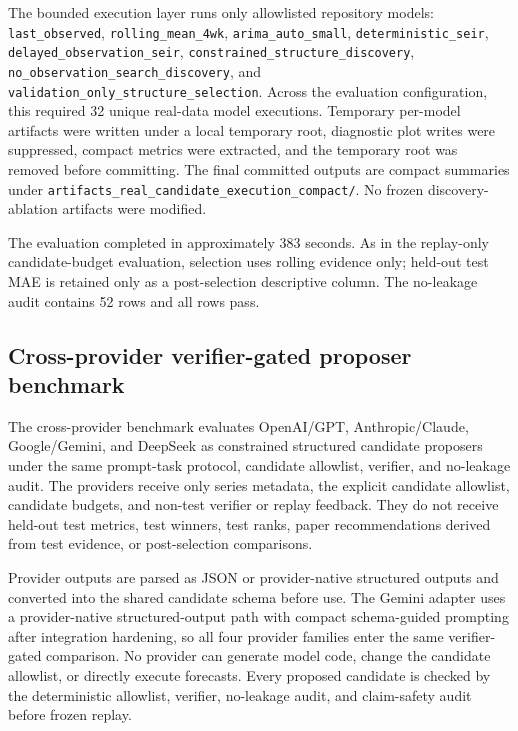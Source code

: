 The bounded execution layer runs only allowlisted repository models:
\texttt{last\_observed}, \texttt{rolling\_mean\_4wk},
\texttt{arima\_auto\_small}, \texttt{deterministic\_seir},
\texttt{delayed\_observation\_seir},
\texttt{constrained\_structure\_discovery},
\texttt{no\_observation\_search\_discovery}, and
\texttt{validation\_only\_structure\_selection}. Across the evaluation
configuration, this required 32 unique real-data model executions. Temporary
per-model artifacts were written under a local temporary root, diagnostic plot
writes were suppressed, compact metrics were extracted, and the temporary root
was removed before committing. The final committed outputs are compact
summaries under \texttt{artifacts\_real\_candidate\_execution\_compact/}. No
frozen discovery-ablation artifacts were modified.

The evaluation completed in approximately \num{383} seconds. As in the
replay-only candidate-budget evaluation,
selection uses rolling evidence only; held-out test MAE is retained only as a
post-selection descriptive column. The no-leakage audit contains 52 rows and
all rows pass.

\subsection{Cross-provider verifier-gated proposer benchmark}

The cross-provider benchmark evaluates OpenAI/GPT, Anthropic/Claude,
Google/Gemini, and DeepSeek as constrained structured candidate proposers
under the same prompt-task
protocol, candidate allowlist, verifier, and no-leakage audit. The providers
receive only series metadata, the explicit candidate allowlist, candidate
budgets, and non-test verifier or replay feedback. They do not receive
held-out test metrics, test winners, test ranks, paper recommendations derived
from test evidence, or post-selection comparisons.

Provider outputs are parsed as JSON or provider-native structured outputs and
converted into the shared candidate schema before use. The Gemini adapter uses
a provider-native structured-output path with compact schema-guided prompting
after integration hardening, so all four provider families enter the same
verifier-gated comparison. No provider can generate model code, change the
candidate allowlist, or directly execute forecasts. Every proposed candidate
is checked by the deterministic allowlist, verifier, no-leakage audit, and
claim-safety audit before frozen replay.

